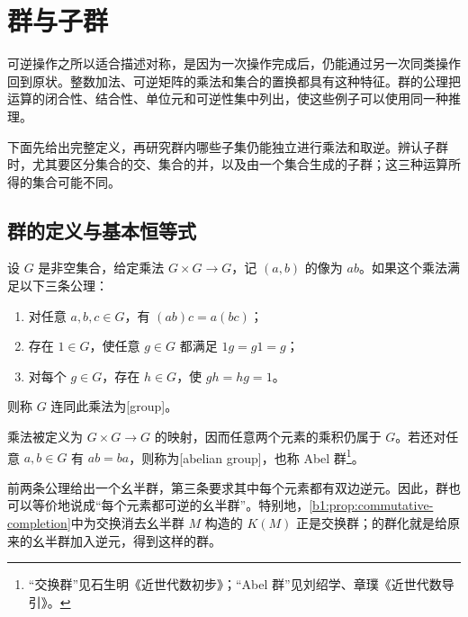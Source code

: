 
\section{群与子群}
\label{b1:sec:0201}

%
%

可逆操作之所以适合描述对称，是因为一次操作完成后，仍能通过另一次同类操作回到原状。整数加法、可逆矩阵的乘法和集合的置换都具有这种特征。群的公理把运算的闭合性、结合性、单位元和可逆性集中列出，使这些例子可以使用同一种推理。

\ProseParagraphBreak
下面先给出完整定义，再研究群内哪些子集仍能独立进行乘法和取逆。辨认子群时，尤其要区分集合的交、集合的并，以及由一个集合生成的子群；这三种运算所得的集合可能不同。

\subsection{群的定义与基本恒等式}
\label{b1:subsec:0201:01}

\begin{definition}\label{b1:def:group}
	设 \(G\) 是非空集合，给定乘法 \(G\times G\rightarrow G\)，记 \((a,b)\) 的像为 \(ab\)。如果这个乘法满足以下三条公理：
	\begin{enumerate}
		\item 对任意 \(a,b,c\in G\)，有 \((ab)c=a(bc)\)；
		\item 存在 \(1\in G\)，使任意 \(g\in G\) 都满足 \(1g=g1=g\)；
		\item 对每个 \(g\in G\)，存在 \(h\in G\)，使 \(gh=hg=1\)。
	\end{enumerate}
	则称 \(G\) 连同此乘法为[group]。

	乘法被定义为 \(G\times G\rightarrow G\) 的映射，因而任意两个元素的乘积仍属于 \(G\)。若还对任意 \(a,b\in G\) 有 \(ab=ba\)，则称为[abelian group]，也称 Abel 群\footnote{“交换群”见石生明《近世代数初步》\cite[第一章第 7 节]{Shi2007IntroModernAlgebra}；“Abel 群”见刘绍学、章璞《近世代数导引》\cite[第二章第 9 节“有限 Abel 群的结构”]{LiuZhang2011IntroModernAlgebra}。}。
\end{definition}

前两条公理给出一个幺半群，第三条要求其中每个元素都有双边逆元。因此，群也可以等价地说成“每个元素都可逆的幺半群”。特别地，\cref{b1:prop:commutative-completion}中为交换消去幺半群 \(M\) 构造的 \(K(M)\) 正是交换群；的群化就是给原来的幺半群加入逆元，得到这样的群。

